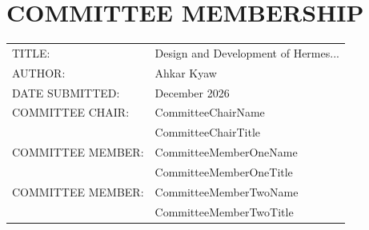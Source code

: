 \chapter*{COMMITTEE MEMBERSHIP}

\begin{tabular}{@{}p{}p{}@{}} 
\hfill TITLE: & Design and Development of Hermes... \\[1.5em] 
\hfill AUTHOR: & Ahkar Kyaw \\[1.5em] 
\hfill DATE SUBMITTED: & December 2026 \\[2em] 
\hfill COMMITTEE CHAIR: & CommitteeChairName\\ 
& CommitteeChairTitle \\[2em] 
\hfill COMMITTEE MEMBER: & CommitteeMemberOneName\\ 
& CommitteeMemberOneTitle \\[2em] 
\hfill COMMITTEE MEMBER: & CommitteeMemberTwoName\\ 
& CommitteeMemberTwoTitle 
\end{tabular}
